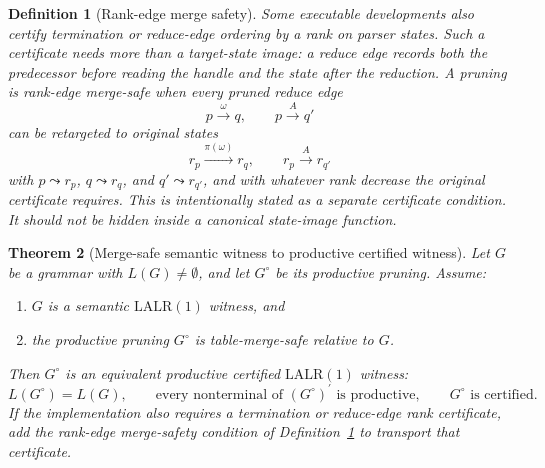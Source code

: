 \documentclass[11pt,a4paper]{article}
\theoremstyle{prettyplain}
\newtheorem{theorem}{Theorem}
\theoremstyle{prettydef}
\newtheorem{definition}[theorem]{Definition}
\newcommand{\LALRone}{\mathrm{LALR(1)}}
\begin{document}
\begin{definition}[Rank-edge merge safety]
\label{def:rank-merge-safety}
Some executable developments also certify termination or reduce-edge ordering by
a rank on parser states.  Such a certificate needs more than a target-state
image: a reduce edge records both the predecessor before reading the handle and
the state after the reduction.  A pruning is \emph{rank-edge merge-safe} when
every pruned reduce edge
\[
p\xrightarrow{\omega}q,
\qquad
p\xrightarrow{A}q'
\]
can be retargeted to original states
\[
r_p\xrightarrow{\pi(\omega)}r_q,
\qquad
r_p\xrightarrow{A}r_{q'}
\]
with \(p\leadsto r_p\), \(q\leadsto r_q\), and \(q'\leadsto r_{q'}\), and with
whatever rank decrease the original certificate requires.  This is intentionally
stated as a separate certificate condition.  It should not be hidden inside a
canonical state-image function.
\end{definition}

\begin{theorem}[Merge-safe semantic witness to productive certified witness]
\label{thm:semantic-to-certified}
Let \(G\) be a grammar with \(L(G)\ne\emptyset\), and let \(G^\circ\) be its
productive pruning.  Assume:
\begin{enumerate}
\item \(G\) is a semantic \(\LALRone\) witness, and
\item the productive pruning \(G^\circ\) is table-merge-safe relative to \(G\).
\end{enumerate}
Then \(G^\circ\) is an equivalent productive certified \(\LALRone\) witness:
\[
L(G^\circ)=L(G),
\qquad
\text{every nonterminal of }(G^\circ)^\prime\text{ is productive},
\qquad
G^\circ\text{ is certified.}
\]
If the implementation also requires a termination or reduce-edge rank
certificate, add the rank-edge merge-safety condition of
Definition~\ref{def:rank-merge-safety} to transport that certificate.
\end{theorem}
\end{document}

